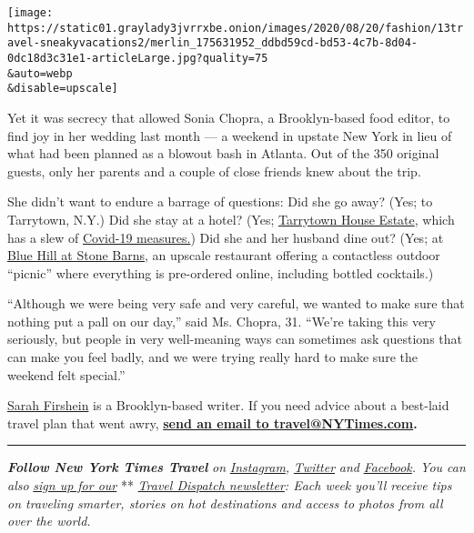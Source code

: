 \texttt{[image: https://static01.graylady3jvrrxbe.onion/images/2020/08/20/fashion/13travel-sneakyvacations2/merlin\_175631952\_ddbd59cd-bd53-4c7b-8d04-0dc18d3c31e1-articleLarge.jpg?quality=75\\\&auto=webp\\\&disable=upscale]}

Yet it was secrecy that allowed Sonia Chopra, a Brooklyn-based food
editor, to find joy in her wedding last month --- a weekend in upstate
New York in lieu of what had been planned as a blowout bash in Atlanta.
Out of the 350 original guests, only her parents and a couple of close
friends knew about the trip.

She didn't want to endure a barrage of questions: Did she go away? (Yes;
to Tarrytown, N.Y.) Did she stay at a hotel? (Yes;
\href{https://www.tarrytownhouseestate.com/}{Tarrytown House Estate},
which has a slew of
\href{https://www.tarrytownhouseestate.com/covid-19-advisory}{Covid-19
measures.}) Did she and her husband dine out? (Yes; at
\href{https://www.nytimes3xbfgragh.onion/2019/10/21/dining/michelin-guide-nyc-2020-blue-hill-at-stone-barns.html}{Blue
Hill at Stone Barns,} an upscale restaurant offering a contactless
outdoor ``picnic'' where everything is pre-ordered online, including
bottled cocktails.)

``Although we were being very safe and very careful, we wanted to make
sure that nothing put a pall on our day,'' said Ms. Chopra, 31. ``We're
taking this very seriously, but people in very well-meaning ways can
sometimes ask questions that can make you feel badly, and we were trying
really hard to make sure the weekend felt special.''

\href{https://twitter.com/sfirshein?lang=en}{Sarah Firshein} is a
Brooklyn-based writer. If you need advice about a best-laid travel plan
that went awry, \textbf{\href{mailto:travel@NYTimes.com}{send an email
to travel@NYTimes.com}.}

\begin{center}\rule{0.5\linewidth}{\linethickness}\end{center}

\emph{\textbf{Follow New York Times Travel}} \emph{on}
\href{https://www.instagram.com/nytimestravel/}{\emph{Instagram}}\emph{,}
\href{https://twitter.com/nytimestravel}{\emph{Twitter}} \emph{and}
\href{https://www.facebookcorewwwi.onion/nytimestravel/}{\emph{Facebook}}\emph{.
You can also}
\href{https://www.nytimes3xbfgragh.onion/newsletters/traveldispatch?action=click\&module=inline\&pgtype=Article}{\emph{sign
up for our}} **
\href{https://www.nytimes3xbfgragh.onion/newsletters/traveldispatch}{\emph{Travel
Dispatch newsletter}}\emph{: Each week you'll receive tips on traveling
smarter, stories on hot destinations and access to photos from all over
the world.}

